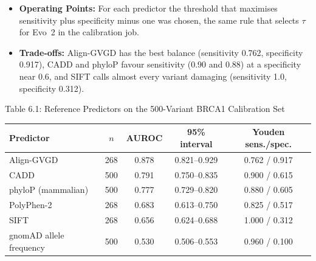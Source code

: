 \begin{itemize}
\item \textbf{Operating Points:} For each predictor the threshold that maximises sensitivity plus specificity minus one was chosen, the same rule that selects $\tau$ for Evo~2 in the calibration job.
\item \textbf{Trade-offs:} Align-GVGD has the best balance (sensitivity 0.762, specificity 0.917), CADD and phyloP favour sensitivity (0.90 and 0.88) at a specificity near 0.6, and SIFT calls almost every variant damaging (sensitivity 1.0, specificity 0.312).
\end{itemize}
\vspace{-4pt}
\begin{center}
\footnotesize\renewcommand{\baselinestretch}{1}\selectfont
\label{tab:6.2}
Table 6.1: Reference Predictors on the 500-Variant BRCA1 Calibration Set\\[3pt]\nopagebreak
\begin{tabular}{@{}lcccc@{}}
\toprule
Predictor & $n$ & AUROC & 95\% interval & Youden sens./spec. \\
\midrule
Align-GVGD & 268 & 0.878 & 0.821--0.929 & 0.762 / 0.917 \\
CADD & 500 & 0.791 & 0.750--0.835 & 0.900 / 0.615 \\
phyloP (mammalian) & 500 & 0.777 & 0.729--0.820 & 0.880 / 0.605 \\
PolyPhen-2 & 268 & 0.683 & 0.613--0.750 & 0.825 / 0.517 \\
SIFT & 268 & 0.656 & 0.624--0.688 & 1.000 / 0.312 \\
gnomAD allele frequency & 500 & 0.530 & 0.506--0.553 & 0.960 / 0.100 \\
\bottomrule
\end{tabular}
\end{center}

